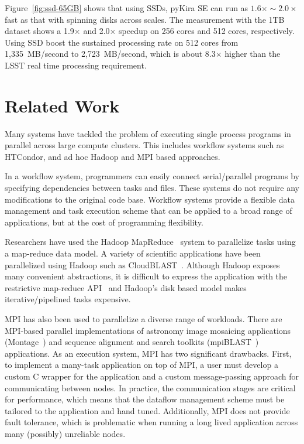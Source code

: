 \documentclass[10pt,journal,compsoc]{IEEEtran}
\begin{document}
Figure~\ref{fig:ssd-65GB} shows that using SSDs, pyKira SE can run as $1.6\times\sim2.0\times$ fast as that with spinning disks across scales.
The measurement with the 1TB dataset  shows a 1.9$\times$ and 2.0$\times$ speedup on 256 cores and 512 cores, respectively.
Using SSD boost the sustained processing rate on 512 cores from 1,335~MB/second to 2,723~MB/second, which is about 8.3$\times$ higher
than the LSST real time processing requirement.

\section{Related Work}
\label{sec:Related}

Many systems have tackled the problem of executing single process programs in parallel
across large compute clusters. This includes workflow systems such as HTCondor,
and ad hoc Hadoop and MPI based approaches.

In a workflow system, programmers can easily connect serial/parallel programs by specifying
dependencies between tasks and files. These systems do not require any modifications to
the original code base. Workflow systems provide a flexible data management and task execution
scheme that can be applied to a broad range of applications, but at the cost of programming
flexibility.

Researchers have used the Hadoop MapReduce~\cite{HADOOP} system to parallelize
tasks using a map-reduce data model. A variety of scientific applications have been parallelized
using Hadoop such as CloudBLAST~\cite{matsunaga08}. 
Although Hadoop exposes many convenient abstractions, it is difficult to express the application 
with the restrictive map-reduce API~\cite{dewitt08} and Hadoop's disk based model makes 
iterative/pipelined tasks expensive.

MPI has also been used to parallelize a diverse range of workloads. There
are MPI-based parallel implementations of astronomy image
mosaicing applications (Montage~\cite{jacob09}) and
sequence alignment and search toolkits (mpiBLAST~\cite{lin08}) applications. As an
execution system, MPI has two significant drawbacks. First, to implement a many-task
application on top of MPI, a user must develop a custom C wrapper for the application
and a custom message-passing approach for communicating between nodes. In practice, the
communication stages are critical for performance, which means that the
dataflow management scheme must be tailored to the application and hand tuned. Additionally,
MPI does not provide fault tolerance, which is problematic when running a long lived
application across many (possibly) unreliable nodes.
\end{document}
